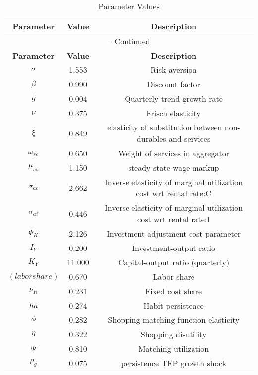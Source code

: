 \begin{center}
\begin{longtable}{ccc}
\caption{Parameter Values}\\%
\toprule%
\multicolumn{1}{c}{\textbf{Parameter}} &
\multicolumn{1}{c}{\textbf{Value}} &
 \multicolumn{1}{c}{\textbf{Description}}\\%
\midrule%
\endfirsthead
\multicolumn{3}{c}{{\tablename} \thetable{} -- Continued}\\%
\midrule%
\multicolumn{1}{c}{\textbf{Parameter}} &
\multicolumn{1}{c}{\textbf{Value}} &
  \multicolumn{1}{c}{\textbf{Description}}\\%
\midrule%
\endhead
${\sigma}$ 	 & 	 1.553 	 & 	 Risk aversion\\
${\beta}$ 	 & 	 0.990 	 & 	 Discount factor\\
${\overline{g}}$ 	 & 	 0.004 	 & 	 Quarterly trend growth rate\\
$\nu$ 	 & 	 0.375 	 & 	 Frisch elasticity\\
$\xi$ 	 & 	 0.849 	 & 	 elasticity of substitution between non-durables and services\\
$\omega_{sc}$ 	 & 	 0.650 	 & 	 Weight of services in aggregator\\
$\mu_{ss}$ 	 & 	 1.150 	 & 	 steady-state wage markup\\
${\sigma_{ac}}$ 	 & 	 2.662 	 & 	 Inverse elasticity of marginal utilization cost wrt rental rate:C\\
${\sigma_{ai}}$ 	 & 	 0.446 	 & 	 Inverse elasticity of marginal utilization cost wrt rental rate:I\\
${\Psi_{K}}$ 	 & 	 2.126 	 & 	 Investment adjustment cost parameter\\
${I_Y}$ 	 & 	 0.200 	 & 	 Investment-output ratio\\
${K_Y}$ 	 & 	 11.000 	 & 	 Capital-output ratio (quarterly)\\
$(labor share)$ 	 & 	 0.670 	 & 	 Labor share\\
${\nu_R}$ 	 & 	 0.231 	 & 	 Fixed cost share\\
${ha}$ 	 & 	 0.274 	 & 	 Habit persistence\\
${\phi}$ 	 & 	 0.282 	 & 	 Shopping matching function elasticity\\
${\eta}$ 	 & 	 0.322 	 & 	 Shopping disutility\\
${\Psi}$ 	 & 	 0.810 	 & 	 Matching utilization\\
${\rho_g}$ 	 & 	 0.075 	 & 	 persistence TFP growth shock\\

\end{longtable}
\end{center}
